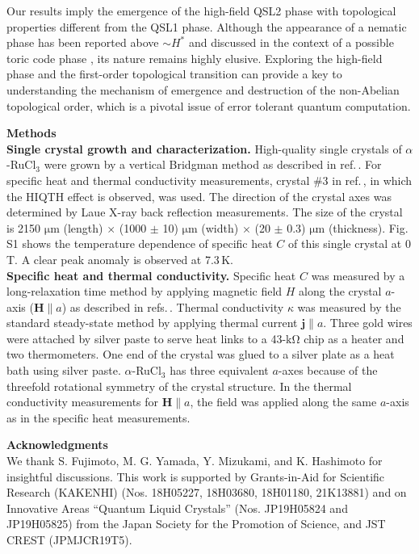 \documentclass[twocolumn,preprintnumbers,prl,superscriptaddress,amsmath,amssymb,amsfonts]{revtex4}
\begin{document}
Our results imply the emergence of the high-field QSL2 phase with topological properties different from the QSL1 phase. Although the appearance of a nematic phase has been reported above $\sim H^*$ \cite{tanaka2020thermodynamic} and discussed in the context of a possible toric code phase \cite{PhysRevResearch.3.023189}, its nature remains highly elusive. Exploring the high-field phase and the first-order topological transition can provide a key to understanding the mechanism of emergence and destruction of the non-Abelian topological order, which is a pivotal issue of error tolerant quantum computation.

\noindent
{\bf Methods}\\
{\bf Single crystal growth and characterization.}
High-quality single crystals of $\alpha$-RuCl$ _3$ were grown by a vertical Bridgman method as described in ref.\,. For specific heat and thermal conductivity measurements, crystal \#3 in ref.\,, in which the HIQTH effect is observed, was used. The direction of the crystal axes was determined by Laue X-ray back reflection measurements. The size of the crystal is 2150 $\mathrm{\mu m}$ (length) $\times$ (1000 $\pm$ 10) $\mathrm{\mu m}$ (width) $\times$ (20 $\pm$ 0.3) $\mathrm{\mu m}$ (thickness). Fig.\,S1 shows the temperature dependence of specific heat $C$ of this single crystal at 0\,T. A clear peak anomaly is observed at 7.3\,K.
\\
{\bf Specific heat and thermal conductivity.}
Specific heat $C$ was measured by a long-relaxation time method by applying magnetic field $H$ along the crystal $a$-axis ($\bm{H} \parallel a$) as described in refs.\,. Thermal conductivity $\kappa$ was measured by the standard steady-state method by applying thermal current $\bm{j} \parallel a$. Three gold wires were attached by silver paste to serve heat links to a 43-$\mathrm{k\Omega}$ chip as a heater and two thermometers. One end of the crystal was glued to a silver plate as a heat bath using silver paste. $\alpha$-RuCl$ _3$ has three equivalent $a$-axes because of the threefold rotational symmetry of the crystal structure. In the thermal conductivity measurements for $\bm{H} \parallel a$, the field was applied along the same $a$-axis as in the specific heat measurements.



\noindent
{\bf Acknowledgments}\\
We thank S. Fujimoto, M. G. Yamada, Y. Mizukami, and K. Hashimoto for insightful discussions. This work is supported by Grants-in-Aid for Scientific Research (KAKENHI) (Nos. 18H05227, 18H03680, 18H01180, 21K13881) and on Innovative Areas ``Quantum Liquid Crystals'' (Nos. JP19H05824 and JP19H05825) from the Japan Society for the Promotion of Science, and JST CREST (JPMJCR19T5).
\end{document}
